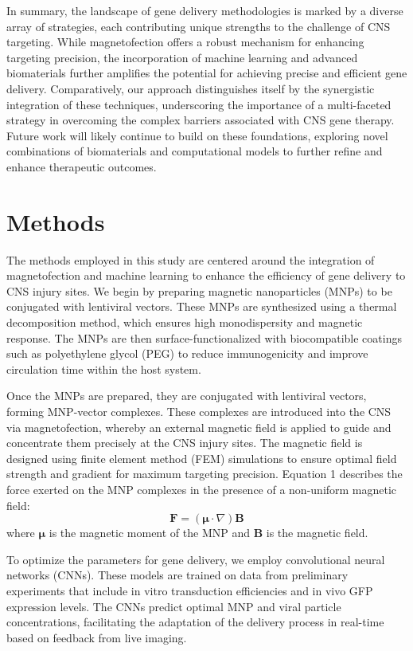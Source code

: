 \documentclass{article}
\begin{document}
In summary, the landscape of gene delivery methodologies is marked by a diverse array of strategies, each contributing unique strengths to the challenge of CNS targeting. While magnetofection offers a robust mechanism for enhancing targeting precision, the incorporation of machine learning and advanced biomaterials further amplifies the potential for achieving precise and efficient gene delivery. Comparatively, our approach distinguishes itself by the synergistic integration of these techniques, underscoring the importance of a multi-faceted strategy in overcoming the complex barriers associated with CNS gene therapy. Future work will likely continue to build on these foundations, exploring novel combinations of biomaterials and computational models to further refine and enhance therapeutic outcomes.

\section{Methods}
The methods employed in this study are centered around the integration of magnetofection and machine learning to enhance the efficiency of gene delivery to CNS injury sites. We begin by preparing magnetic nanoparticles (MNPs) to be conjugated with lentiviral vectors. These MNPs are synthesized using a thermal decomposition method, which ensures high monodispersity and magnetic response. The MNPs are then surface-functionalized with biocompatible coatings such as polyethylene glycol (PEG) to reduce immunogenicity and improve circulation time within the host system.

Once the MNPs are prepared, they are conjugated with lentiviral vectors, forming MNP-vector complexes. These complexes are introduced into the CNS via magnetofection, whereby an external magnetic field is applied to guide and concentrate them precisely at the CNS injury sites. The magnetic field is designed using finite element method (FEM) simulations to ensure optimal field strength and gradient for maximum targeting precision. Equation 1 describes the force exerted on the MNP complexes in the presence of a non-uniform magnetic field: 
\[
\mathbf{F} = (\bm{\mu} \cdot \nabla)\mathbf{B}
\]
where \(\bm{\mu}\) is the magnetic moment of the MNP and \(\mathbf{B}\) is the magnetic field.

To optimize the parameters for gene delivery, we employ convolutional neural networks (CNNs). These models are trained on data from preliminary experiments that include in vitro transduction efficiencies and in vivo GFP expression levels. The CNNs predict optimal MNP and viral particle concentrations, facilitating the adaptation of the delivery process in real-time based on feedback from live imaging.
\end{document}
